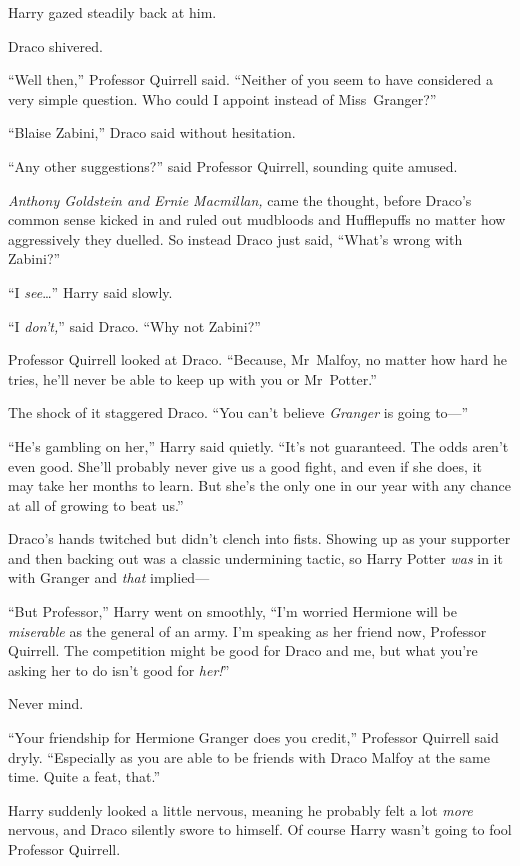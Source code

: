 Harry gazed steadily back at him.

Draco shivered.

“Well then,” Professor Quirrell said. “Neither of you seem to have considered a very simple question. Who could I appoint instead of Miss~Granger?”

“Blaise Zabini,” Draco said without hesitation.

“Any other suggestions?” said Professor Quirrell, sounding quite amused.

\emph{Anthony Goldstein and Ernie Macmillan,} came the thought, before Draco’s common sense kicked in and ruled out mudbloods and Hufflepuffs no matter how aggressively they duelled. So instead Draco just said, “What’s wrong with Zabini?”

“I \emph{see}…” Harry said slowly.

“I \emph{don’t,}” said Draco. “Why not Zabini?”

Professor Quirrell looked at Draco. “Because, Mr~Malfoy, no matter how hard he tries, he’ll never be able to keep up with you or Mr~Potter.”

The shock of it staggered Draco. “You can’t believe \emph{Granger} is going to—”

“He’s gambling on her,” Harry said quietly. “It’s not guaranteed. The odds aren’t even good. She’ll probably never give us a good fight, and even if she does, it may take her months to learn. But she’s the only one in our year with any chance at all of growing to beat us.”

Draco’s hands twitched but didn’t clench into fists. Showing up as your supporter and then backing out was a classic undermining tactic, so Harry Potter \emph{was} in it with Granger and \emph{that} implied—

“But Professor,” Harry went on smoothly, “I’m worried Hermione will be \emph{miserable} as the general of an army. I’m speaking as her friend now, Professor Quirrell. The competition might be good for Draco and me, but what you’re asking her to do isn’t good for \emph{her!}”

Never mind.

“Your friendship for Hermione Granger does you credit,” Professor Quirrell said dryly. “Especially as you are able to be friends with Draco Malfoy at the same time. Quite a feat, that.”

Harry suddenly looked a little nervous, meaning he probably felt a lot \emph{more} nervous, and Draco silently swore to himself. Of course Harry wasn’t going to fool Professor Quirrell.

